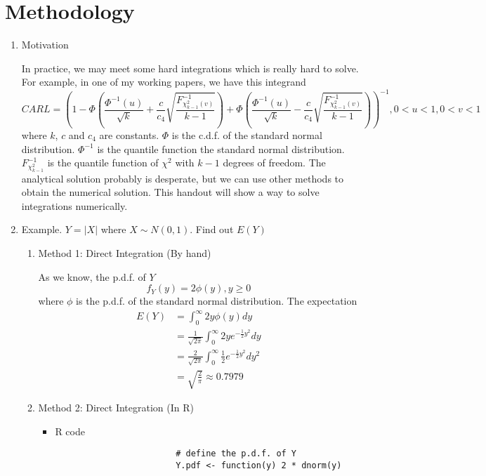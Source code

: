 \section{Methodology}
\begin{enumerate}
	\item Motivation
	\par In practice, we may meet some hard integrations which is really hard to solve. For example, in one of my working papers, we have this integrand
		\begin{equation*}
			CARL = (1 - \Phi(\frac{\Phi^{-1}(u)}{\sqrt{k}} + \frac{c}{c_4}\sqrt{\frac{F^{-1}_{\chi^2_{k-1}(v)}}{k-1}}) + \Phi(\frac{\Phi^{-1}(u)}{\sqrt{k}} - \frac{c}{c_4}\sqrt{\frac{F^{-1}_{\chi^2_{k-1}(v)}}{k-1}}))^{-1}, 0<u<1, 0<v<1
		\end{equation*}
		where $k$, $c$ and $c_4$ are constants. $\Phi$ is the c.d.f. of the standard normal distribution. $\Phi^{-1}$ is the quantile function the standard normal distribution. $F^{-1}_{\chi^2_{k-1}}$ is the quantile function of $\chi^2$ with $k-1$ degrees of freedom. The analytical solution probably is desperate, but we can use other methods to obtain the numerical solution. This handout will show a way to solve integrations numerically.
	
	\item Example. $Y = |X|$ where $X \sim N(0, 1)$. Find out $E(Y)$
		\begin{enumerate}
			\item Method 1: Direct Integration (By hand)
				\par As we know, the p.d.f. of $Y$
				\begin{equation*}
					f_Y(y) = 2\phi(y), y \ge 0
				\end{equation*}
				where $\phi$ is the p.d.f. of the standard normal distribution. The expectation
				\begin{equation*}
					\begin{split}
						E(Y) &= \int_{0}^{\infty} 2y\phi(y) dy \\
						& = \frac{1}{\sqrt{2\pi}}\int_{0}^{\infty} 2y e^{-\frac{1}{2}y^2}dy \\
						& = \frac{2}{\sqrt{2\pi}}\int_{0}^{\infty} \frac{1}{2} e^{-\frac{1}{2}y^2}dy^2 \\
						& = \sqrt{\frac{2}{\pi}} \approx 0.7979
					\end{split}
				\end{equation*}
			\item Method 2: Direct Integration (In R)
				\begin{itemize}
					\item R code
					\begin{verbatim}
						# define the p.d.f. of Y
						Y.pdf <- function(y) 2 * dnorm(y)
						

\end{verbatim}
\end{itemize}
\end{enumerate}
\end{enumerate}
